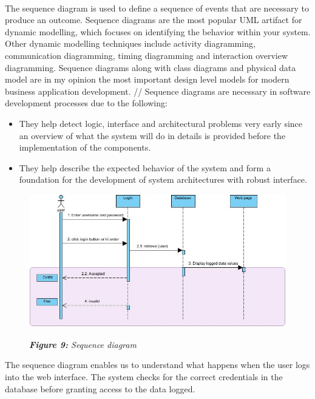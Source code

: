 \documentclass[12pt]{article}
\begin{document}
\paragraph*{}
The sequence diagram is used to define a sequence of events that are necessary to produce an outcome. Sequence diagrams are the most popular UML artifact for dynamic modelling, which focuses on identifying the behavior within your system. Other dynamic modelling techniques include activity diagramming, communication diagramming, timing diagramming and interaction overview diagramming. Sequence diagrams along with class diagrams and physical data model are in my opinion the most important design level models for modern business application development. //
Sequence diagrams are necessary in software development processes due to the following:
\begin{itemize}
\item  They help detect logic, interface and architectural problems very early since an overview of what the system will do in details is provided before the implementation of the components. 
\item They help describe the expected behavior of the system and form a foundation for the development of system architectures with robust interface.
\end{itemize} 
 
 \newpage
\begin{figure}
\includegraphics[scale=0.4]{Sequence Diagram1.jpg}   %
\begin{center}
\textit{\textbf{Figure 9:} Sequence diagram}  %
\end{center}
\end{figure} 

The sequence diagram enables us to understand what happens when the user logs into the web interface. The system checks for the correct credentials in the database before granting access to the data logged.
\end{document}

